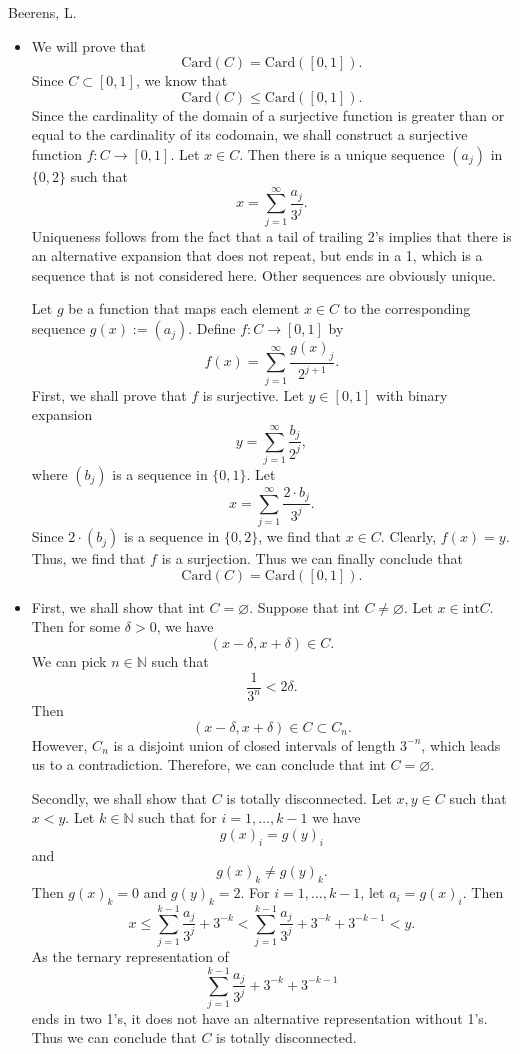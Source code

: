 \begin{solution}[4.9]{Beerens, L.}
\begin{itemize}
        \item We will prove that
        $$
            \text{Card}(C) = \text{Card}([0,1]).
        $$
        Since $C\subset [0,1]$, we know that 
        $$
            \text{Card}(C) \leq \text{Card}([0,1]).
        $$
        Since the cardinality of the domain of a surjective function is greater than or equal to the cardinality of its codomain, we shall construct a surjective function $f:C\rightarrow[0,1]$. Let $x\in C$. Then there is a unique sequence $(a_j)$ in $\{ 0,2 \}$ such that 
        $$
            x = \sum_{j=1}^\infty \frac{a_j}{3^j}.
        $$
        Uniqueness follows from the fact that a tail of trailing 2's implies that there is an alternative expansion that does not repeat, but ends in a 1, which is a sequence that is not considered here. Other sequences are obviously unique.
        
        Let $g$ be a function that maps each element $x\in C$ to the corresponding sequence $g(x):=(a_j)$. Define $f:C\rightarrow [0,1]$ by
        $$
            f(x) = \sum_{j=1}^\infty\frac{g(x)_j}{2^{j+1}}.
        $$
        First, we shall prove that $f$ is surjective. Let $y\in[0,1]$ with binary expansion
        $$
            y=\sum_{j=1}^\infty \frac{b_j}{2^j},
        $$
        where $(b_j)$ is a sequence in $\{0,1\}$. Let
        $$
            x = \sum_{j=1}^\infty\frac{2\cdot b_j}{3^j}.
        $$
        Since $2\cdot(b_j)$ is a sequence in $\{0,2\}$, we find that $x\in C$. Clearly, $f(x)=y$. Thus, we find that $f$ is a surjection.
        Thus we can finally conclude that 
        $$
            \text{Card}(C) = \text{Card}([0,1]).
        $$
        
        \item First, we shall show that int $C=\varnothing$. Suppose that int $C\neq \varnothing$. Let $x\in\text{int}C$. Then for some $\delta>0$, we have 
        $$
            (x-\delta, x+\delta)\in C.
        $$
        We can pick $n\in \mathbb{N}$ such that
        $$
            \frac{1}{3^n}<2\delta.
        $$
        Then 
        $$
            (x-\delta, x+\delta)\in C\subset C_n.
        $$
        However, $C_n$  is a disjoint union of closed intervals of length $3^{-n}$, which leads us to a contradiction. Therefore, we can conclude that int $C =\varnothing$.
        
        Secondly, we shall show that $C$ is totally disconnected. Let $x,y\in C$ such that $x<y$. Let $k\in\mathbb{N}$ such that for $i=1,\hdots,k-1$ we have 
        $$
            g(x)_i = g(y)_i
        $$ 
        and 
        $$
            g(x)_k \neq g(y)_k.
        $$ 
        Then $g(x)_k=0$ and $g(y)_k=2$. For $i=1,\hdots,k-1$, let $a_i=g(x)_i$. Then 
        $$
            x\leq \sum_{j=1}^{k-1}\frac{a_j}{3^j} + 3^{-k} < \sum_{j=1}^{k-1}\frac{a_j}{3^j} + 3^{-k} + 3^{-k-1} < y.
        $$
        As the ternary representation of 
        $$
            \sum_{j=1}^{k-1}\frac{a_j}{3^j} + 3^{-k} + 3^{-k-1}
        $$
        ends in two 1's, it does not have an alternative representation without 1's. Thus we can conclude that $C$ is totally disconnected. 
        

\end{itemize}
\end{solution}
